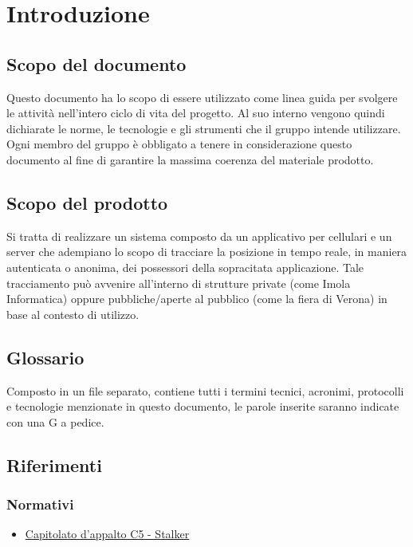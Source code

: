 \section{Introduzione}
\subsection{Scopo del documento}
Questo documento ha lo scopo di essere utilizzato come linea guida per svolgere le attività nell'intero ciclo di vita del progetto.
Al suo interno vengono quindi dichiarate le norme, le tecnologie e gli strumenti che il gruppo \Gruppo{} intende utilizzare.
Ogni membro del gruppo è obbligato a tenere in considerazione questo documento al fine di garantire la massima coerenza del materiale prodotto.
	
\subsection{Scopo del prodotto}
Si tratta di realizzare un sistema composto da un applicativo per cellulari e un server che adempiano lo scopo di tracciare la posizione in tempo reale, in maniera autenticata o anonima, dei possessori della sopracitata applicazione. Tale tracciamento può avvenire all’interno di strutture private (come Imola Informatica) oppure pubbliche/aperte al pubblico (come la fiera di Verona) in base al contesto di utilizzo.
	 
\subsection{Glossario}
Composto in un file separato, contiene tutti i termini tecnici, acronimi, protocolli e tecnologie menzionate in questo documento, le parole inserite saranno indicate con una G a pedice.
	
\subsection{Riferimenti} 
\subsubsection{Normativi}
\begin{itemize}
	\item \href{https://www.math.unipd.it/~tullio/IS-1/2019/Progetto/C5.pdf}{Capitolato d'appalto C5 - Stalker}
\end{itemize}

